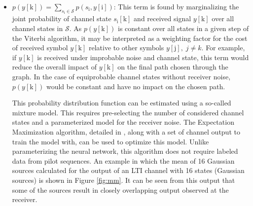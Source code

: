\begin{itemize}
\item $p(y[\mathrm{k}]) = \sum_{s_{\mathrm{i}} \in \textit{$\mathcal{S}$}}p(s_{\mathrm{i}},y[\mathrm{i}])$: This term is found by marginalizing the joint probability of channel state $s_{\mathrm{i}}[\mathrm{k}]$ and received signal $y[\mathrm{k}]$ over all channel states in $\mathcal{S}$. As $p(y[\mathrm{k}])$ is constant over all states in a given step of the Viterbi algorithm, it may be interpreted as a weighting factor for the cost of received symbol $y[\mathrm{k}]$ relative to other symbols $y[\mathrm{j}], \; j\neq k$. For example, if $y[\mathrm{k}]$ is received under improbable noise and channel state, this term would reduce the overall impact of $y[\mathrm{k}]$ on the final path chosen through the graph. In the case of equiprobable channel states without receiver noise, $p(y[\mathrm{k}])$ would be constant and have no impact on the chosen path.
\par
This probability distribution function can be estimated using a so-called mixture model. This requires pre-selecting the number of considered channel states and a parameterized model for the receiver noise. The Expectation Maximization algorithm, detailed in \cite{ng2000cs229}, along with a set of channel output to train the model with, can be used to optimize this model. Unlike parameterizing the neural network, this algorithm does not require labeled data from pilot sequences. An example in which the mean of 16 Gaussian sources calculated for the output of an LTI channel with 16 states (Gaussian sources) is shown in Figure \ref{fig:mm}. It can be seen from this output that some of the sources result in closely overlapping output observed at the receiver. 
%
%



\end{itemize}
